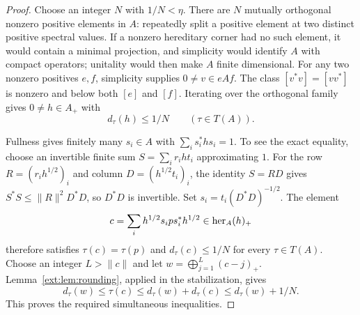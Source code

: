 \begin{proof}
Choose an integer $N$ with $1/N<\eta$. There are $N$ mutually
orthogonal nonzero positive elements in $A$: repeatedly split a
positive element at two distinct positive spectral values. If a
nonzero hereditary corner had no such element, it would contain a
minimal projection, and simplicity would identify $A$ with compact
operators; unitality would then make $A$ finite dimensional.
For any two nonzero positives $e,f$, simplicity supplies
$0\ne v\in eAf$. The class $[v^*v]=[vv^*]$ is nonzero and
below both $[e]$ and $[f]$. Iterating over the orthogonal family
gives $0\ne h\in A_+$ with
\[
 d_\tau(h)\le 1/N\qquad(\tau\in T(A)).
\]

Fullness gives finitely many $s_i\in A$ with
$\sum_i s_i^*hs_i=1$. To see the exact equality, choose an
invertible finite sum $S=\sum_i r_iht_i$ approximating $1$.
For the row $R=(r_ih^{1/2})_i$ and column
$D=(h^{1/2}t_i)_i$, the identity $S=RD$ gives
$S^*S\le\|R\|^2D^*D$, so $D^*D$ is invertible.
Set $s_i=t_i(D^*D)^{-1/2}$.
The element
\[
 c=\sum_i h^{1/2}s_i p s_i^*h^{1/2}\in\operatorname{her}_A(h)_+
\]
therefore satisfies $\tau(c)=\tau(p)$ and
$d_\tau(c)\le1/N$ for every $\tau\in T(A)$.
Choose an integer $L>\|c\|$ and let
$w=\bigoplus_{j=1}^L(c-j)_+$. Lemma~\ref{ext:lem:rounding},
applied in the stabilization, gives
\[
 d_\tau(w)\le\tau(c)\le d_\tau(w)+d_\tau(c)
                       \le d_\tau(w)+1/N.
\]
This proves the required simultaneous inequalities.
\end{proof}
